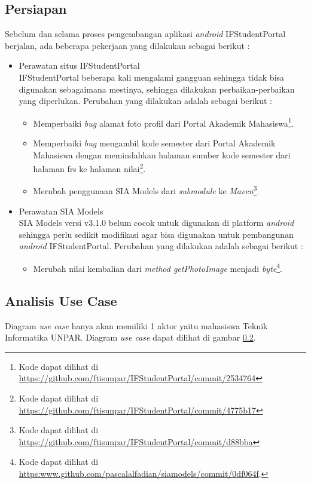 \subsection{Persiapan}
Sebelum dan selama proses pengembangan aplikasi \textit{android} IFStudentPortal berjalan, ada beberapa pekerjaan yang dilakukan sebagai berikut :
\begin{itemize}
    \item Perawatan situs IFStudentPortal\\
    IFStudentPortal beberapa kali mengalami gangguan sehingga tidak bisa digunakan sebagaimana mestinya, sehingga dilakukan perbaikan-perbaikan yang diperlukan. Perubahan yang dilakukan adalah sebagai berikut :
    \begin{itemize}
        \item Memperbaiki \textit{bug} alamat foto profil dari Portal Akademik Mahasiswa\footnote{Kode dapat dilihat di \url{https://github.com/ftisunpar/IFStudentPortal/commit/2534764}}.
        \item Memperbaiki \textit{bug} mengambil kode semester dari Portal Akademik Mahasiswa dengan memindahkan halaman sumber kode semester dari halaman frs ke halaman nilai\footnote{Kode dapat dilihat di \url{https://github.com/ftisunpar/IFStudentPortal/commit/4775b17}}.
        \item Merubah penggunaan SIA Models dari \textit{submodule} ke \textit{Maven}\footnote{Kode dapat dilihat di \url{https://github.com/ftisunpar/IFStudentPortal/commit/d88bba}}.
    \end{itemize}
    \item Perawatan SIA Models\\
    SIA Models versi v3.1.0 belum cocok untuk digunakan di platform \textit{android} sehingga perlu sedikit modifikasi agar bisa digunakan untuk pembangunan \textit{android} IFStudentPortal. Perubahan yang dilakukan adalah sebagai berikut :
    \begin{itemize}
        \item Merubah nilai kembalian dari \textit{method getPhotoImage} menjadi \textit{byte}\footnote{Kode dapat dilihat di \url{https:www.github.com/pascalalfadian/siamodels/commit/0df064f}.}.
    \end{itemize}
\end{itemize}

\subsection{Analisis Use Case}
Diagram \textit{use case} hanya akan memiliki 1 aktor yaitu mahasiswa Teknik Informatika UNPAR. Diagram \textit{use case} dapat dilihat di gambar \ref{}. 


